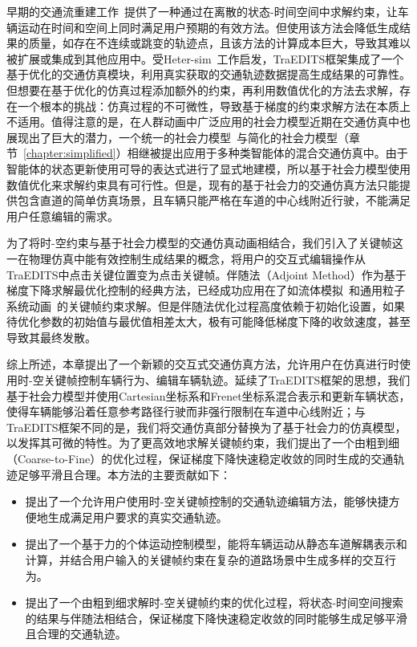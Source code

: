 早期的交通流重建工作~\cite{van2007kinodynamic, sewall2010virtualized}提供了一种通过在离散的状态-时间空间中求解约束，让车辆运动在时间和空间上同时满足用户预期的有效方法。但使用该方法会降低生成结果的质量，如存在不连续或跳变的轨迹点，且该方法的计算成本巨大，导致其难以被扩展或集成到其他应用中。受Heter-sim~\cite{ren2019heter}工作启发，TraEDITS框架集成了一个基于优化的交通仿真模块，利用真实获取的交通轨迹数据提高生成结果的可靠性。但想要在基于优化的仿真过程添加额外的约束，再利用数值优化的方法去求解，存在一个根本的挑战：仿真过程的不可微性，导致基于梯度的约束求解方法在本质上不适用。值得注意的是，在人群动画中广泛应用的社会力模型近期在交通仿真中也展现出了巨大的潜力，一个统一的社会力模型~\cite{chao2019force}与简化的社会力模型（章节~\ref{chapter:simplified}）相继被提出应用于多种类智能体的混合交通仿真中。由于智能体的状态更新使用可导的表达式进行了显式地建模，所以基于社会力模型使用数值优化来求解约束具有可行性。但是，现有的基于社会力的交通仿真方法只能提供包含直道的简单仿真场景，且车辆只能严格在车道的中心线附近行驶，不能满足用户任意编辑的需求。

为了将时-空约束与基于社会力模型的交通仿真动画相结合，我们引入了关键帧这一在物理仿真中能有效控制生成结果的概念，将用户的交互式编辑操作从TraEDITS中点击关键位置变为点击关键帧。伴随法（Adjoint Method）作为基于梯度下降求解最优化控制的经典方法，已经成功应用在了如流体模拟~\cite{mcnamara2004fluid}和通用粒子系统动画~\cite{wojtan2006keyframe}的关键帧约束求解。但是伴随法优化过程高度依赖于初始化设置，如果待优化参数的初始值与最优值相差太大，极有可能降低梯度下降的收敛速度，甚至导致其最终发散。

综上所述，本章提出了一个新颖的交互式交通仿真方法，允许用户在仿真进行时使用时-空关键帧控制车辆行为、编辑车辆轨迹。延续了TraEDITS框架的思想，我们基于社会力模型并使用Cartesian坐标系和Frenet坐标系混合表示和更新车辆状态，使得车辆能够沿着任意参考路径行驶而非强行限制在车道中心线附近；与TraEDITS框架不同的是，我们将交通仿真部分替换为了基于社会力的仿真模型，以发挥其可微的特性。为了更高效地求解关键帧约束，我们提出了一个由粗到细（Coarse-to-Fine）的优化过程，保证梯度下降快速稳定收敛的同时生成的交通轨迹足够平滑且合理。本方法的主要贡献如下：

\begin{itemize}
    \item 提出了一个允许用户使用时-空关键帧控制的交通轨迹编辑方法，能够快捷方便地生成满足用户要求的真实交通轨迹。

    \item 提出了一个基于力的个体运动控制模型，能将车辆运动从静态车道解耦表示和计算，并结合用户输入的关键帧约束在复杂的道路场景中生成多样的交互行为。

    \item 提出了一个由粗到细求解时-空关键帧约束的优化过程，将状态-时间空间搜索的结果与伴随法相结合，保证梯度下降快速稳定收敛的同时能够生成足够平滑且合理的交通轨迹。
    
\end{itemize}



